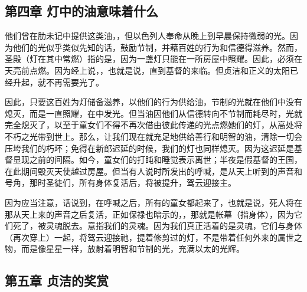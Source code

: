 
\subsection{第四章 灯中的油意味着什么}

他们曾在肋未记中提供这类油，，但以色列人奉命从晚上到早晨保持微弱的光。因为他们的光似乎类似先知的话，鼓励节制，并藉百姓的行为和信德得滋养。然而，圣殿（灯在其中常燃）指的是，因为一盏灯只能在一所房屋中照耀。因此，必须在天亮前点燃。因为经上说，，也就是说，直到基督的来临。但贞洁和正义的太阳已经升起，就不再需要光了。\par

因此，只要这百姓为灯储备滋养，以他们的行为供给油，节制的光就在他们中没有熄灭，而是一直照耀，在中发光。但当油因他们从信德转向不节制而耗尽时，光就完全熄灭了，以至于童女们不得不再次借由彼此传递的光点燃她们的灯，从高处将不朽之光带到世上。那么，让我们现在就充足地供给善行和明智的油，清除一切会压垮我们的朽坏；免得在新郎迟延的时候，我们的灯也同样熄灭。因为这迟延是基督显现之前的间隔。如今，童女们的打盹和睡觉表示离世；半夜是假基督的王国，在此期间毁灭天使越过房屋。但当有人说时所发出的呼喊，是从天上听到的声音和号角，那时圣徒们，所有身体复活后，将被提升，驾云迎接主。\par

因为应当注意，话说到，在呼喊之后，所有的童女都起来了，也就是说，死人将在那从天上来的声音之后复活，正如保禄也暗示的，，那就是帐幕（指身体），因为它们死了，被灵魂脱去。意指我们的灵魂。因为我们真正活着的是灵魂，它们与身体（再次穿上）一起，将驾云迎接祂，提着修剪过的灯，不是带着任何外来的属世之物，而是像星星一样，放射着明智和节制的光，充满以太的光辉。\par


\subsection{第五章 贞洁的奖赏}


